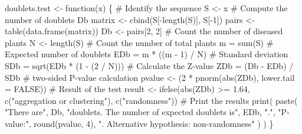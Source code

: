 \documentclass[
  letterpaper,
  DIV=11,
  numbers=noendperiod]{scrreprt}
\newenvironment{Shaded}{\begin{snugshade}}{\end{snugshade}}
\newcommand{\AttributeTok}[1]{\textcolor[rgb]{0.40,0.45,0.13}{#1}}
\newcommand{\CommentTok}[1]{\textcolor[rgb]{0.37,0.37,0.37}{#1}}
\newcommand{\ConstantTok}[1]{\textcolor[rgb]{0.56,0.35,0.01}{#1}}
\newcommand{\ControlFlowTok}[1]{\textcolor[rgb]{0.00,0.23,0.31}{#1}}
\newcommand{\DecValTok}[1]{\textcolor[rgb]{0.68,0.00,0.00}{#1}}
\newcommand{\FloatTok}[1]{\textcolor[rgb]{0.68,0.00,0.00}{#1}}
\newcommand{\FunctionTok}[1]{\textcolor[rgb]{0.28,0.35,0.67}{#1}}
\newcommand{\NormalTok}[1]{\textcolor[rgb]{0.00,0.23,0.31}{#1}}
\newcommand{\OtherTok}[1]{\textcolor[rgb]{0.00,0.23,0.31}{#1}}
\newcommand{\SpecialCharTok}[1]{\textcolor[rgb]{0.37,0.37,0.37}{#1}}
\newcommand{\StringTok}[1]{\textcolor[rgb]{0.13,0.47,0.30}{#1}}
\begin{document}
\begin{Shaded}
\begin{Highlighting}[]
\NormalTok{doublets.test }\OtherTok{\textless{}{-}} \ControlFlowTok{function}\NormalTok{(x) \{}
  \CommentTok{\# Identify the sequence}
\NormalTok{  S }\OtherTok{\textless{}{-}}\NormalTok{ x}
  \CommentTok{\# Compute the number of doublets Db}
\NormalTok{  matrix }\OtherTok{\textless{}{-}} \FunctionTok{cbind}\NormalTok{(S[}\SpecialCharTok{{-}}\FunctionTok{length}\NormalTok{(S)], S[}\SpecialCharTok{{-}}\DecValTok{1}\NormalTok{])}
\NormalTok{  pairs }\OtherTok{\textless{}{-}} \FunctionTok{table}\NormalTok{(}\FunctionTok{data.frame}\NormalTok{(matrix))}
\NormalTok{  Db }\OtherTok{\textless{}{-}}\NormalTok{ pairs[}\DecValTok{2}\NormalTok{, }\DecValTok{2}\NormalTok{]}
  \CommentTok{\# Count the number of diseased plants}
\NormalTok{  N }\OtherTok{\textless{}{-}} \FunctionTok{length}\NormalTok{(S)}
  \CommentTok{\# Count the number of total plants}
\NormalTok{  m }\OtherTok{=} \FunctionTok{sum}\NormalTok{(S)}
  \CommentTok{\# Expected number of doublets}
\NormalTok{  EDb }\OtherTok{=}\NormalTok{ m }\SpecialCharTok{*}\NormalTok{ ((m }\SpecialCharTok{{-}} \DecValTok{1}\NormalTok{) }\SpecialCharTok{/}\NormalTok{ N)}
  \CommentTok{\# Standard deviation}
\NormalTok{  SDb }\OtherTok{=} \FunctionTok{sqrt}\NormalTok{(EDb }\SpecialCharTok{*}\NormalTok{ (}\DecValTok{1} \SpecialCharTok{{-}}\NormalTok{ (}\DecValTok{2} \SpecialCharTok{/}\NormalTok{ N)))}
  \CommentTok{\# Calculate the Z{-}value}
\NormalTok{  ZDb }\OtherTok{=}\NormalTok{ (Db }\SpecialCharTok{{-}}\NormalTok{ EDb) }\SpecialCharTok{/}\NormalTok{ SDb}
  \CommentTok{\# two{-}sided P{-}value calculation}
\NormalTok{  pvalue }\OtherTok{\textless{}{-}}\NormalTok{ (}\DecValTok{2} \SpecialCharTok{*} \FunctionTok{pnorm}\NormalTok{(}\FunctionTok{abs}\NormalTok{(ZDb), }\AttributeTok{lower.tail =} \ConstantTok{FALSE}\NormalTok{))}
  \CommentTok{\# Result of the test}
\NormalTok{  result }\OtherTok{\textless{}{-}} \FunctionTok{ifelse}\NormalTok{(}\FunctionTok{abs}\NormalTok{(ZDb) }\SpecialCharTok{\textgreater{}=} \FloatTok{1.64}\NormalTok{,}
                   \FunctionTok{c}\NormalTok{(}\StringTok{"aggregation or clustering"}\NormalTok{),}
                   \FunctionTok{c}\NormalTok{(}\StringTok{"randomness"}\NormalTok{))}
  \CommentTok{\# Print the results}
  \FunctionTok{print}\NormalTok{(}
    \FunctionTok{paste}\NormalTok{(}
      \StringTok{"There are"}\NormalTok{,}
\NormalTok{      Db,}
      \StringTok{"doublets. The number of expected doublets is"}\NormalTok{,}
\NormalTok{      EDb,}
      \StringTok{"."}\NormalTok{,}
      \StringTok{"P{-}value:"}\NormalTok{,}
      \FunctionTok{round}\NormalTok{(pvalue, }\DecValTok{4}\NormalTok{),}
      \StringTok{". Alternative hypothesis: non{-}randomness"}
\NormalTok{    )}
\NormalTok{  )}
\NormalTok{\}}
\end{Highlighting}
\end{Shaded}
\end{document}
